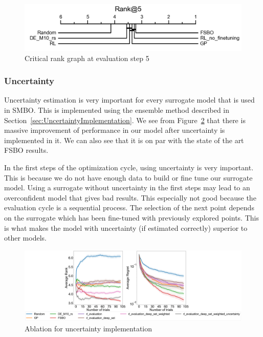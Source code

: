 \documentclass[12pt, twoside, ngerman]{report}
\begin{document}
\begin{figure}[h]
  \centering
    \includegraphics[scale=0.35]{images/RLEvaluationBasicScoringRank5}
    \caption{Critical rank graph at evaluation step 5}
    \label{fig:RLEvaluationBasicScoringRank5}
\end{figure}


\subsubsection{Uncertainty}
Uncertainty estimation is very important for every surrogate model that is used in SMBO.
This is implemented using the ensemble method described in Section~\ref{sec:UncertaintyImplementation}.
We see from Figure~\ref{fig:RLUncertaintybenchmark} that there is massive improvement of performance in our model after uncertainty is implemented in it.
We can also see that it is on par with the state of the art FSBO results.

In the first steps of the optimization cycle,  using uncertainty is very important.  This is because we do not have enough data to build or fine tune our surrogate model.
Using a surrogate without uncertainty in the first steps may lead to an overconfident model that gives bad results.
This especially not good because the evaluation cycle is a sequential process.
The selection of the next point depends on the surrogate which has been fine-tuned with previously explored points.
This is what makes the model with uncertainty (if estimated correctly) superior to other models.
 
\begin{figure}[h]
  \centering
    \includegraphics[scale=0.20]{images/RLUncertaintybenchmark}
    \caption{Ablation for uncertainty implementation}
    \label{fig:RLUncertaintybenchmark}
\end{figure}
\end{document}
